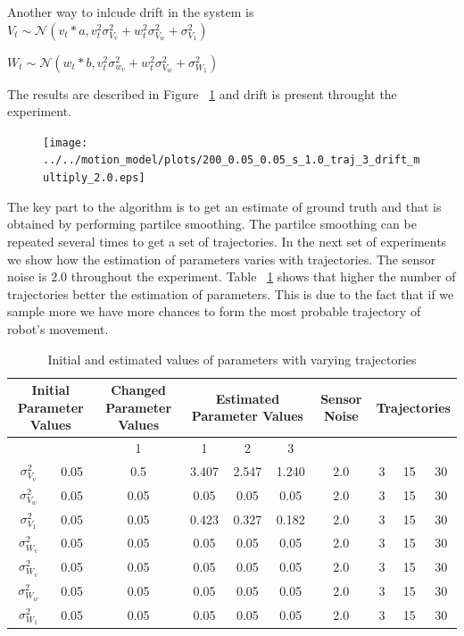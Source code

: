 \documentclass[12pt,draft]{dalcsthesis}
\begin{document}
Another way to inlcude drift in the system is 
$V_{t}\sim\mathcal{{N}}(v_{t}*a,v_{t}^{2}\sigma_{V_{v}}^{2}+w_{t}^{2}\sigma_{V_{w}}^{2}+\sigma_{V_{1}}^{2})$

$W_{t}\sim\mathcal{{N}}(w_{t}*b,v_{t}^{2}\sigma_{w_{v}}^{2}+w_{t}^{2}\sigma_{V_{w}}^{2}+\sigma_{W_{1}}^{2})$

The results are described in Figure ~\ref{fig-drift_multiply} and drift is present throught the experiment.
\begin{figure}
  \centering
     {\texttt{[image: ../../motion\_model/plots/200\_0.05\_0.05\_s\_1.0\_traj\_3\_drift\_multiply\_2.0.eps]}}
  \caption{\label{fig-drift_multiply} }
\end{figure}

The key part to the algorithm is to get an estimate of ground truth and that is obtained by performing partilce smoothing. The partilce smoothing can be repeated several times to get a set of trajectories. In the next set of experiments we show how the estimation of parameters varies with trajectories. The sensor noise is $2.0$ throughout the experiment. Table ~\ref{tab-: trajectory} shows that higher the number of trajectories better the estimation of parameters. This is due to the fact that if we sample more we have more chances to form the most probable trajectory of robot's movement. 

\begin{table}[tbh]



\centering

\begin{tabular}{|c|c|c|c|c|c|c|c|c|c|}
\hline 
\multicolumn{2}{|c|}{Initial Parameter Values} & Changed Parameter Values & \multicolumn{3}{c|}{Estimated Parameter Values} & Sensor Noise & \multicolumn{3}{c}{Trajectories}\tabularnewline
\hline 
 &  & 1 & 1 & 2 & 3 &  &  &  & \tabularnewline
\hline 
$\sigma_{V_{v}}^{2}$ & 0.05 & 0.5 & 3.407 & 2.547 & 1.240 & 2.0 & 3 & 15 & 30\tabularnewline
\hline 
$\sigma_{V_{w}}^{2}$ & 0.05 & 0.05 & 0.05 & 0.05 & 0.05 & 2.0 & 3 & 15 & 30\tabularnewline
\hline 
$\sigma_{V_{1}}^{2}$ & 0.05 & 0.05 & 0.423 & 0.327 & 0.182 & 2.0 & 3 & 15 & 30\tabularnewline
\hline 
$\sigma_{W_{v}}^{2}$ & 0.05 & 0.05 & 0.05 & 0.05 & 0.05 & 2.0 & 3 & 15 & 30\tabularnewline
\hline 
$\sigma_{W_{v}}^{2}$ & 0.05 & 0.05 & 0.05 & 0.05 & 0.05 & 2.0 & 3 & 15 & 30\tabularnewline
\hline 
$\sigma_{W_{w}}^{2}$ & 0.05 & 0.05 & 0.05 & 0.05 & 0.05 & 2.0 & 3 & 15 & 30\tabularnewline
\hline 
$\sigma_{W_{1}}^{2}$ & 0.05 & 0.05 & 0.05 & 0.05 & 0.05 & 2.0 & 3 & 15 & 30\tabularnewline
\hline 
\end{tabular}
\caption{\label{tab-: trajectory}Initial and estimated values of parameters with varying trajectories}
\end{table}
\end{document}
